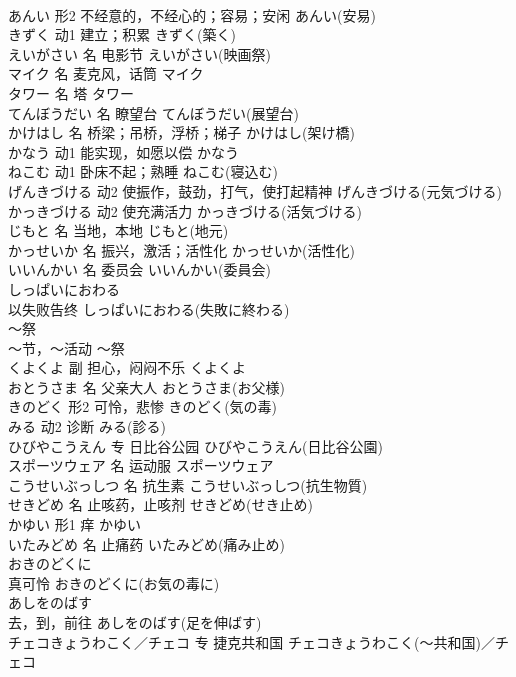 \documentclass[8pt]{extreport}
\begin{document}
\begin{CJK}{UTF8}{min}
\\	あんい	形2	不经意的，不经心的；容易；安闲	あんい(安易)	
\\	きずく	动1	建立；积累	きずく(築く)	
\\	えいがさい	名	电影节	えいがさい(映画祭)	
\\	マイク	名	麦克风，话筒	マイク	
\\	タワー	名	塔	タワー	
\\	てんぼうだい	名	瞭望台	てんぼうだい(展望台)	
\\	かけはし	名	桥梁；吊桥，浮桥；梯子	かけはし(架け橋)	
\\	かなう	动1	能实现，如愿以偿	かなう	
\\	ねこむ	动1	卧床不起；熟睡	ねこむ(寝込む)	
\\	げんきづける	动2	使振作，鼓劲，打气，使打起精神	げんきづける(元気づける)	
\\	かっきづける	动2	使充满活力	かっきづける(活気づける)	
\\	じもと	名	当地，本地	じもと(地元)	
\\	かっせいか	名	振兴，激活；活性化	かっせいか(活性化)	
\\	いいんかい	名	委员会	いいんかい(委員会)	
\\	しっぱいにおわる	
\\	以失败告终	しっぱいにおわる(失敗に終わる)	
\\	～祭	
\\	～节，～活动	～祭	
\\	くよくよ	副	担心，闷闷不乐	くよくよ	
\\	おとうさま	名	父亲大人	おとうさま(お父様)	
\\	きのどく	形2	可怜，悲惨	きのどく(気の毒)	
\\	みる	动2	诊断	みる(診る)	
\\	ひびやこうえん	专	日比谷公园	ひびやこうえん(日比谷公園)	
\\	スポーツウェア	名	运动服	スポーツウェア	
\\	こうせいぶっしつ	名	抗生素	こうせいぶっしつ(抗生物質)	
\\	せきどめ	名	止咳药，止咳剂	せきどめ(せき止め)	
\\	かゆい	形1	痒	かゆい	
\\	いたみどめ	名	止痛药	いたみどめ(痛み止め)	
\\	おきのどくに	
\\	真可怜	おきのどくに(お気の毒に)	
\\	あしをのばす	
\\	去，到，前往	あしをのばす(足を伸ばす)	
\\	チェコきょうわこく／チェコ	专	捷克共和国	チェコきょうわこく(～共和国)／チェコ	

\end{CJK}
\end{document}
